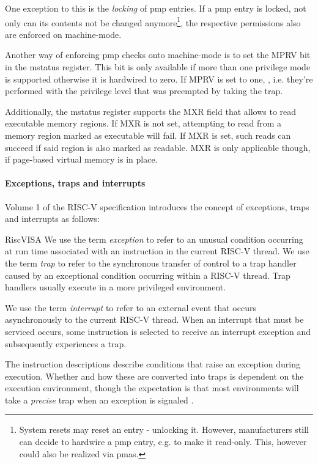One exception to this is the \textit{locking} of \gls{pmp} entries.
If a \gls{pmp} entry is locked, not only can its contents not be changed anymore\footnote{%
    System resets may reset an entry - unlocking it.
    However, manufacturers still can decide to hardwire a \gls{pmp} entry, e.g. to make it read-only.
    This, however could also be realized via \glspl{pma}.
}, the respective permissions also are enforced on machine-mode.

Another way of enforcing \gls{pmp} checks onto machine-mode is to set the MPRV bit in the \gls{mstatus} register.
This bit is only available if more than one privilege mode is supported otherwise it is hardwired to zero.
If MPRV is set to one, , i.e. they're performed with the privilege level that was preempted by taking the trap.

Additionally, the \gls{mstatus} register supports the MXR field that allows to read executable memory regions.
If MXR is not set, attempting to read from a memory region marked as executable will fail.
If MXR is set, such reads can succeed if said region is also marked as readable.
MXR is only applicable though, if page-based virtual memory is in place.

\paragraph{Exceptions, traps and interrupts}

Volume 1 of the RISC-V specification \cite{RiscVISA} introduces the concept of exceptions, traps and interrupts as follows:

\begin{displaycquote}{RiscVISA}
    We use the term \textit{exception} to refer to an unusual condition occurring at run time associated with an instruction in the current RISC-V thread.
    We use the term \textit{trap} to refer to the synchronous transfer of control to a trap handler caused by an exceptional condition occurring within a RISC-V thread.
    Trap handlers usually execute in a more privileged environment.

    We use the term \textit{interrupt} to refer to an external event that occurs asynchronously to the current RISC-V thread.
    When an interrupt that must be serviced occurs, some instruction is selected to receive an interrupt exception and subsequently experiences a trap.

    The instruction descriptions \textelp{} describe conditions that raise an exception during execution.
    Whether and how these are converted into traps is dependent on the execution environment, though the expectation is that most environments will take a \textit{precise} trap when an exception is signaled \textelp{}.
\end{displaycquote}


